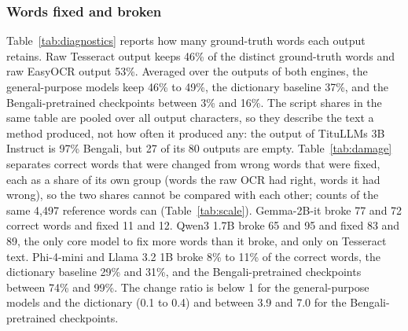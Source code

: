 \documentclass[conference]{IEEEtran}
\begin{document}


\subsubsection{Words fixed and broken}
Table~\ref{tab:diagnostics} reports how many ground-truth words each output retains. Raw Tesseract output keeps 46\% of the distinct ground-truth words and raw EasyOCR output 53\%. Averaged over the outputs of both engines, the general-purpose models keep 46\% to 49\%, the dictionary baseline 37\%, and the Bengali-pretrained checkpoints between 3\% and 16\%. The script shares in the same table are pooled over all output characters, so they describe the text a method produced, not how often it produced any: the output of TituLLMs 3B Instruct is 97\% Bengali, but 27 of its 80 outputs are empty. Table~\ref{tab:damage} separates correct words that were changed from wrong words that were fixed, each as a share of its own group (words the raw OCR had right, words it had wrong), so the two shares cannot be compared with each other; counts of the same 4{,}497 reference words can (Table~\ref{tab:scale}). Gemma-2B-it broke 77 and 72 correct words and fixed 11 and 12. Qwen3 1.7B broke 65 and 95 and fixed 83 and 89, the only core model to fix more words than it broke, and only on Tesseract text. Phi-4-mini and Llama 3.2 1B broke 8\% to 11\% of the correct words, the dictionary baseline 29\% and 31\%, and the Bengali-pretrained checkpoints between 74\% and 99\%. The change ratio is below 1 for the general-purpose models and the dictionary (0.1 to 0.4) and between 3.9 and 7.0 for the Bengali-pretrained checkpoints.




\end{document}
